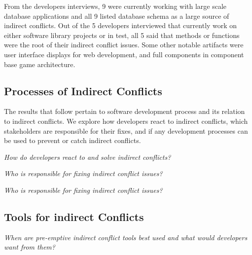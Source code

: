 \documentclass[conference]{IEEEtran}
\begin{document}
From the developers interviews, 9 were currently working with large scale database applications and all 9 listed database
schema as a large source of indirect conflicts. Out of the 5 developers interviewed that currently work on either software
library projects or in test, all 5 said that methods or functions were the root of their indirect conflict issues. Some
other notable artifacts were user interface displays for web development, and full components in component base game
architecture. 

\subsection{Processes of Indirect Conflicts}

The results that follow pertain to software development process and its relation to indirect conflicts. We explore
how developers react to indirect conflicts, which stakeholders are responsible for their fixes, and if any development
processes can be used to prevent or catch indirect conflicts.

\begin{description}[topsep=6pt]
	\item[RQ4] \textit{How do developers react to and solve indirect conflicts?}
\end{description}


\begin{description}[topsep=6pt]
	\item[RQ5] \textit{Who is responsible for fixing indirect conflict issues?}
\end{description}

\begin{description}[topsep=6pt]
	\item[RQ6] \textit{Who is responsible for fixing indirect conflict issues?}
\end{description}

\subsection{Tools for indirect Conflicts}

\begin{description}[topsep=6pt]
	\item[RQ7] \textit{When are pre-emptive indirect conflict tools best used and what would developers want from them?}
\end{description}
\end{document}
